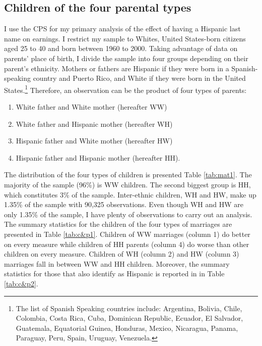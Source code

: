 \documentclass[12pt,english]{article}
\begin{document}
\subsection{Children of the four parental types}

I use the CPS for my primary analysis of the effect of having a Hispanic last name on earnings. I restrict my sample to Whites, United States-born citizens aged 25 to 40 and born between 1960 to 2000. Taking advantage of data on parents' place of birth, I divide the sample into four groups depending on their parent's ethnicity. Mothers or fathers are Hispanic if they were born in a Spanish-speaking country and Puerto Rico, and White if they were born in the United States.\footnote{The list of Spanish Speaking countries include: Argentina, Bolivia, Chile, Colombia, Costa Rica, Cuba, Dominican Republic, Ecuador, El Salvador, Guatemala, Equatorial Guinea, Honduras, Mexico, Nicaragua, Panama, Paraguay, Peru, Spain, Uruguay, Venezuela.} Therefore, an observation can be the product of four types of parents: 
\begin{enumerate}
\item White father and White mother (hereafter WW) 
\item White father and Hispanic mother (hereafter WH)
\item Hispanic father and White mother (hereafter HW)
\item Hispanic father and Hispanic mother (hereafter HH).
\end{enumerate}

The distribution of the four types of children is presented Table \ref{tab:mat1}. The majority of the sample (96\%) is WW children. The second biggest group is HH, which constitutes 3\% of the sample. Inter-ethnic children, WH and HW, make up 1.35\% of the sample with 90,325 observations. Even though WH and HW are only 1.35\% of the sample, I have plenty of observations to carry out an analysis. The summary statistics for the children of the four types of marriages are presented in Table \ref{tab:c&p1}. Children of WW marriages (column 1) do better on every measure while children of HH parents (column 4) do worse than other children on every measure. Children of WH (column 2) and HW (column 3) marriages fall in between WW and HH children. Moreover, the summary statistics for those that also identify as Hispanic is reported in in Table \ref{tab:c&p2}.

\end{document}
